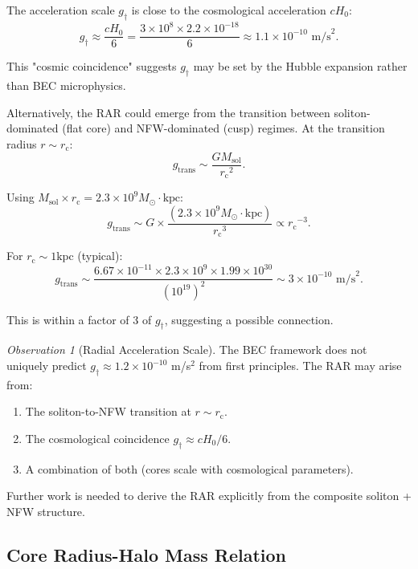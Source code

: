 \documentclass[11pt,a4paper]{article}
\newcommand{\ee}[1]{\times 10^{#1}}
\newcommand{\Msun}{\ensuremath{M_\odot}}
\newcommand{\Msol}{\ensuremath{M_{\mathrm{sol}}}}
\newcommand{\kpc}{\ensuremath{\mathrm{kpc}}}
\newcommand{\rc}{\ensuremath{r_{\mathrm{c}}}}
\newcommand{\gdagger}{\ensuremath{g_{\dagger}}}
\theoremstyle{definition}
\theoremstyle{remark}
\newtheorem{observation}{Observation}[section]
\begin{document}
The acceleration scale $\gdagger$ is close to the cosmological acceleration $cH_0$:
\begin{equation}
\gdagger \approx \frac{cH_0}{6} = \frac{3 \times 10^8 \times 2.2 \times 10^{-18}}{6} \approx 1.1 \times 10^{-10} \text{ m/s}^2.
\end{equation}

This "cosmic coincidence" suggests $\gdagger$ may be set by the Hubble expansion rather than BEC microphysics.

Alternatively, the RAR could emerge from the transition between soliton-dominated (flat core) and NFW-dominated (cusp) regimes. At the transition radius $r \sim \rc$:
\begin{equation}
g_{\mathrm{trans}} \sim \frac{G\Msol}{\rc^2}.
\end{equation}

Using $\Msol \times \rc = 2.3 \times 10^9 \Msun \cdot \kpc$:
\begin{equation}
g_{\mathrm{trans}} \sim G \times \frac{(2.3 \times 10^9 \Msun \cdot \kpc)}{\rc^3} \propto \rc^{-3}.
\end{equation}

For $\rc \sim 1 \kpc$ (typical):
\begin{equation}
g_{\mathrm{trans}} \sim \frac{6.67\ee{-11} \times 2.3\ee{9} \times 1.99\ee{30}}{(10^{19})^2} \sim 3 \times 10^{-10} \text{ m/s}^2.
\end{equation}

This is within a factor of 3 of $\gdagger$, suggesting a possible connection.

\begin{observation}[Radial Acceleration Scale]
The BEC framework does not uniquely predict $\gdagger \approx 1.2 \times 10^{-10}$ m/s$^2$ from first principles. The RAR may arise from:
\begin{enumerate}[leftmargin=*]
\item The soliton-to-NFW transition at $r \sim \rc$.
\item The cosmological coincidence $\gdagger \approx cH_0/6$.
\item A combination of both (cores scale with cosmological parameters).
\end{enumerate}

Further work is needed to derive the RAR explicitly from the composite soliton + NFW structure.
\end{observation}

\subsection{Core Radius-Halo Mass Relation}
\label{sec:rc_Mhalo}
\end{document}
